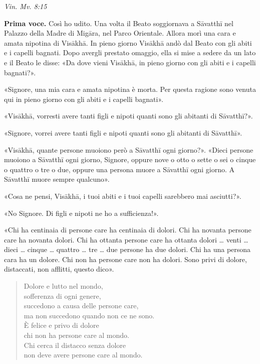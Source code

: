 \emph{Vin. Mv. 8:15}


\textbf{Prima voce.} Così ho udito. Una volta il Beato soggiornava a Sāvatthī nel
Palazzo della Madre di Migāra, nel Parco Orientale. Allora morì una cara
e amata nipotina di Visākhā. In pieno giorno Visākhā andò dal Beato con
gli abiti e i capelli bagnati. Dopo avergli prestato omaggio, ella si
mise a sedere da un lato e il Beato le disse: «Da dove vieni Visākhā, in
pieno giorno con gli abiti e i capelli bagnati?».


«Signore, una mia cara e amata nipotina è morta. Per questa ragione sono
venuta qui in pieno giorno con gli abiti e i capelli bagnati».


«Visākhā, vorresti avere tanti figli e nipoti quanti sono gli abitanti
di Sāvatthī?».


«Signore, vorrei avere tanti figli e nipoti quanti sono gli abitanti di
Sāvatthī».


«Visākhā, quante persone muoiono però a Sāvatthī ogni giorno?». «Dieci
persone muoiono a Sāvatthī ogni giorno, Signore, oppure nove o otto o
sette o sei o cinque o quattro o tre o due, oppure una persona muore a
Sāvatthī ogni giorno. A Sāvatthī muore sempre qualcuno».


«Cosa ne pensi, Visākhā, i tuoi abiti e i tuoi capelli sarebbero mai
asciutti?».


«No Signore. Di figli e nipoti ne ho a sufficienza!».


«Chi ha centinaia di persone care ha centinaia di dolori. Chi ha novanta
persone care ha novanta dolori. Chi ha ottanta persone care ha ottanta
dolori … venti … dieci … cinque … quattro … tre … due persone ha due
dolori. Chi ha una persona cara ha un dolore. Chi non ha persone care
non ha dolori. Sono privi di dolore, distaccati, non afflitti, questo
dico».


\begin{quotation}
Dolore e lutto nel mondo, \\
sofferenza di ogni genere, \\
succedono a causa delle persone care, \\
ma non succedono quando non ce ne sono. \\
È felice e privo di dolore \\
chi non ha persone care al mondo. \\
Chi cerca il distacco senza dolore \\
non deve avere persone care al mondo.
\end{quotation}

